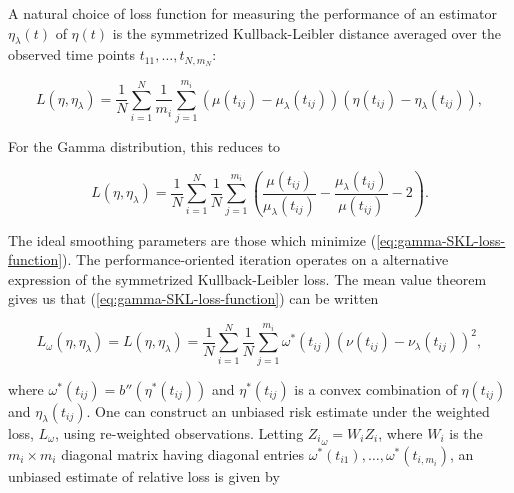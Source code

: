 \noindent
A natural choice of loss function for measuring the performance of an estimator $\eta_\lambda\left(t\right)$ of $\eta \left(t\right)$ is the symmetrized Kullback-Leibler distance averaged over the observed time points $t_{11}, \dots ,  t_{N,m_N}$:

\begin{equation}\label{eq:SKL-loss-function}
L\left( \eta,\eta_\lambda \right) = \frac{1}{N}\sum_{i=1}^N \frac{1}{m_i}\sum_{j=1}^{m_i}  \left(\mu\left(t_{ij}\right) - \mu_\lambda \left(t_{ij}\right)\right)\left( \eta\left(t_{ij}\right) - \eta_\lambda\left(t_{ij}\right)\right),
\end{equation}

\noindent
For the Gamma distribution, this reduces to 

\begin{equation}\label{eq:gamma-SKL-loss-function}
L\left( \eta,\eta_\lambda \right) = \frac{1}{N}\sum_{i=1}^N \frac{1}{N}\sum_{j=1}^{m_i}  \left( \frac{\mu\left(t_{ij}\right)}{\mu_\lambda\left(t_{ij}\right)} - \frac{\mu_\lambda \left(t_{ij}\right)}{\mu\left(t_{ij}\right)} - 2\right).
\end{equation}


\noindent The ideal smoothing parameters are those which minimize (\ref{eq:gamma-SKL-loss-function}). The performance-oriented iteration operates on a alternative expression of the symmetrized Kullback-Leibler loss. The mean value theorem gives us that (\ref{eq:gamma-SKL-loss-function}) can be written

\begin{equation}\label{eq:gamma-SKL-loss-function-mvt}
L_\omega\left( \eta,\eta_\lambda \right) = L\left( \eta,\eta_\lambda \right) = \frac{1}{N}\sum_{i=1}^N \frac{1}{N}\sum_{j=1}^{m_i} \omega^*\left(t_{ij}\right)  \left( \nu\left(t_{ij}\right) - \nu_\lambda\left(t_{ij}\right)\right)^2,
\end{equation}

\noindent
where $\omega^*\left(t_{ij}\right) = b''\left(\eta^*\left(t_{ij}\right)\right)$ and $\eta^*\left(t_{ij}\right)$ is a convex combination of  $\eta\left(t_{ij}\right)$ and $\eta_\lambda\left(t_{ij}\right)$. One can construct an unbiased risk estimate under the weighted loss, $L_\omega$, using re-weighted observations. Letting ${Z_{i}}_\omega = W_i Z_i$, where $W_i$ is the $m_i \times m_i$ diagonal matrix having diagonal entries $\omega^*\left(t_{i1}\right), \dots, \omega^*\left(t_{i,m_i}\right)$, an unbiased estimate of relative loss is given by 

